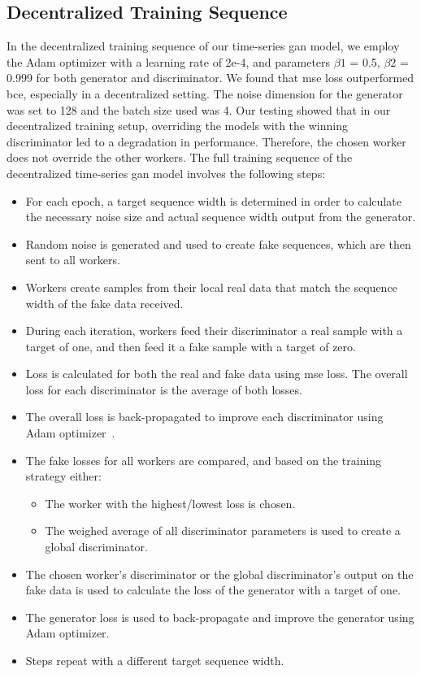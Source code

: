 \subsection{Decentralized Training Sequence}
%
In the decentralized training sequence of our time-series \gls*{gan} model, we employ the Adam optimizer with a learning rate of 2e-4, and parameters $\beta1$ = 0.5, $\beta2$ = 0.999 for both generator and discriminator. We found that \gls*{mse} loss outperformed \gls*{bce}, especially in a decentralized setting. The noise dimension for the generator was set to 128 and the batch size used was 4. Our testing showed that in our decentralized training setup, overriding the models with the winning discriminator led to a degradation in performance. Therefore, the chosen worker does not override the other workers. The full training sequence of the decentralized time-series \gls*{gan} model involves the following steps:
%
\begin{itemize}
\item For each epoch, a target sequence width is determined in order to calculate the necessary noise size and actual sequence width output from the generator.
\item Random noise is generated and used to create fake sequences, which are then sent to all workers.
\item Workers create samples from their local real data that match the sequence width of the fake data received.
\item During each iteration, workers feed their discriminator a real sample with a target of one, and then feed it a fake sample with a target of zero.
\item Loss is calculated for both the real and fake data using \gls*{mse} loss. The overall loss for each discriminator is the average of both losses.
\item The overall loss is back-propagated to improve each discriminator using Adam optimizer~\cite{adam_optimizer}.
\item The fake losses for all workers are compared, and based on the training strategy either:
\begin{itemize}
\item The worker with the highest/lowest loss is chosen.
\item The weighed average of all discriminator parameters is used to create a global discriminator. %
\end{itemize}
\item The chosen worker's discriminator or the global discriminator's output on the fake data is used to calculate the loss of the generator with a target of one.
\item The generator loss is used to back-propagate and improve the generator using Adam optimizer.
\item Steps repeat with a different target sequence width.
\end{itemize}


